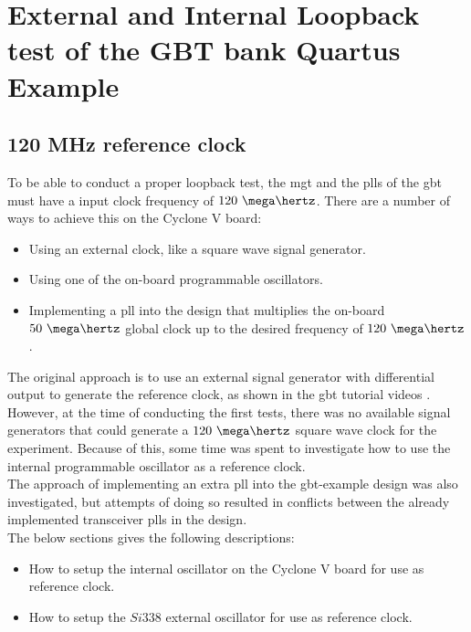 \documentclass[main.tex]{subfiles}
\begin{document}
\chapter{External and Internal Loopback test of the GBT bank Quartus Example}

\section{120 MHz reference clock}


To be able to conduct a proper loopback test, the \gls{mgt} and the \glspl{pll} of the \gls{gbt} must have a input clock frequency of $120~\mega\hertz$. There are a number of ways to achieve this on the Cyclone V board: 
\begin{itemize}\setlength{\itemsep}{10pt}
\item Using an external clock, like a square wave signal generator.
\item Using one of the on-board programmable oscillators.
\item Implementing a \gls{pll} into the design that multiplies the on-board $50~\mega\hertz$ global clock up to the desired frequency of $120~\mega\hertz$.
\end{itemize}

The original approach is to use an external signal generator with differential output to generate the reference clock, as shown in the \gls{gbt} tutorial videos \cite{gbt_videos}. However, at the time of conducting the first tests, there was no available signal generators that could generate a $120~\mega\hertz$ square wave clock for the experiment. Because of this, some time was spent to investigate how to use the internal programmable oscillator as a reference clock.\\

The approach of implementing an extra \gls{pll} into the \gls{gbt}-example design was also investigated, but attempts of doing so resulted in conflicts between the already implemented transceiver \glspl{pll} in the design. \\

The below sections gives the following descriptions:
\begin{itemize}\setlength{\itemsep}{10pt}
\item How to setup the internal oscillator on the Cyclone V board for use as reference clock.
\item How to setup the $Si338$ external oscillator for use as reference clock.
\end{itemize}
\end{document}

